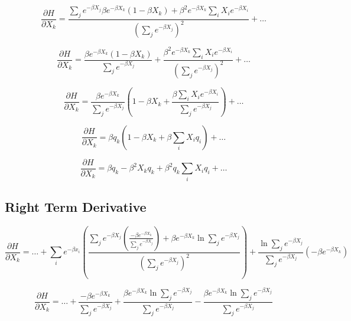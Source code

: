 \begin{displaymath}
    \frac{\partial H}{\partial X_{k}} =
    \frac{\sum_{j}e^{-\beta X_{j}} \beta e^{-\beta X_{k}}\left(1 - \beta X_{k}\right) + \beta^{2} e^{-\beta X_{k}} \sum_{i}X_{i}e^{-\beta X_{i}}}{\left(\sum_{j}e^{-\beta X_{j}}\right)^{2}}
    + \ldots
\end{displaymath}

\begin{displaymath}
    \frac{\partial H}{\partial X_{k}} =
    \frac{\beta e^{-\beta X_{k}}\left(1 - \beta X_{k}\right)}{\sum_{j}e^{-\beta X_{j}}}
    + \frac{\beta^{2} e^{-\beta X_{k}} \sum_{i}X_{i}e^{-\beta X_{i}}}{\left(\sum_{j}e^{-\beta X_{j}}\right)^{2}}
    + \ldots
\end{displaymath}

\begin{displaymath}
    \frac{\partial H}{\partial X_{k}} =
    \frac{\beta e^{-\beta X_{k}}}{\sum_{j}e^{-\beta X_{j}}} \left(1 - \beta X_{k} + \frac{\beta \sum_{i}X_{i}e^{-\beta X_{i}}}{\sum_{j}e^{-\beta X_{j}}}\right)
    + \ldots
\end{displaymath}

\begin{displaymath}
    \frac{\partial H}{\partial X_{k}} = \beta q_{k} \left(1 - \beta X_{k} + \beta \sum_{i}X_{i}q_{i}\right) + \ldots
\end{displaymath}

\begin{displaymath}
    \frac{\partial H}{\partial X_{k}} = \beta q_{k} - \beta^{2}X_{k}q_{k} + \beta^{2}q_{k}\sum_{i}X_{i}q_{i} + \ldots
\end{displaymath}

\subsection{Right Term Derivative}

\begin{displaymath}
    \frac{\partial H}{\partial X_{k}} = \ldots + 
    \sum_{i}e^{-\beta x_{i}} \left(\frac{\sum_{j}e^{-\beta X_{j}} \left(\frac{-\beta e^{-\beta X_{k}}}{\sum_{j}e^{-\beta X_{j}}}\right)
    + \beta e^{-\beta X_{k}}\ln{\sum_{j}e^{-\beta X_{j}}}}{\left(\sum_{j}e^{-\beta X_{j}}\right)^{2}}\right)
    + \frac{\ln{\sum_{j}e^{-\beta X_{j}}}}{\sum_{j}e^{-\beta X_{j}}}\left(-\beta e^{-\beta X_{k}}\right)
\end{displaymath}

\begin{displaymath}
    \frac{\partial H}{\partial X_{k}} = \ldots + 
    \frac{-\beta e^{-\beta X_{k}}}{\sum_{j}e^{-\beta X_{j}}}
    + \frac{\beta e^{-\beta X_{k}}\ln{\sum_{j}e^{-\beta X_{j}}}}{\sum_{j}e^{-\beta X_{j}}}
    - \frac{\beta e^{-\beta X_{k}} \ln{\sum_{j}e^{-\beta X_{j}}}}{\sum_{j}e^{-\beta X_{j}}}
\end{displaymath}

